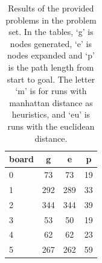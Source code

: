 \begin{table}[h]
\begin{minipage}{\textwidth}
\begin{minipage}{0.30\textwidth}
\begin{tabular}{l | c | c | c }
				board 		& g 		& e 		& p 	\\ \hline
				0 			& 73 		& 73 		& 19	\\
				1 			& 292		& 289		& 33	\\
				2 			& 344		& 344		& 39	\\
				3 			& 53		& 50		& 19	\\
				4 			& 62		& 62		& 23	\\
				5 			& 267		& 262		& 59	\\
			\end{tabular}
		\end{minipage}
	\end{minipage}
	\caption{Results of the provided problems in the problem set. In the tables, `g' is nodes generated, `e' is nodes expanded and `p' is the path length from start to goal. The letter `m' is for runs with manhattan distance as heuristics, and `eu' is runs with the euclidean distance.}
	\label{table:results}
\end{table}